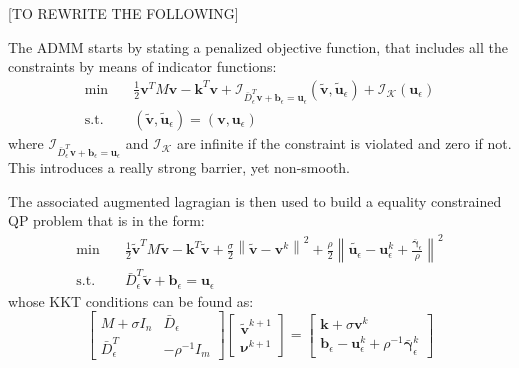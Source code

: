 \documentclass{svproc}
\newcommand{\vect}[1]{\bm{#1}}
\newcommand{\norm}[1]{\left\lVert#1\right\rVert}
\begin{document}
[TO REWRITE THE FOLLOWING]


The ADMM starts by stating a penalized objective function, that includes all the constraints by means of indicator functions:
\begin{subequations}
	\begin{align}
	\text{min} \quad & \frac{1}{2} \vect{v}^T M \vect{v} - \vect{k}^T\vect{v} + \mathcal{I}_{\bar{D}_{\epsilon}^T \vect{v} + \vect{b}_\epsilon  = \vect{u}_\epsilon} (\tilde{\vect{v}}, \tilde{\vect{u}}_\epsilon) +
	\mathcal{I}_{\mathcal{K}}(\vect{u}_\epsilon)\\
	\text{s.t.} \quad & (\tilde{\vect{v}}, \tilde{\vect{u}}_\epsilon) = (\vect{v}, \vect{u}_\epsilon)
	\end{align}
\end{subequations}
where $\mathcal{I}_{\bar{D}_{\epsilon}^T \vect{v} + \vect{b}_\epsilon  = \vect{u}_\epsilon}$ and $\mathcal{I}_{\mathcal{K}}$ are infinite if the constraint is violated and zero if not. This introduces a really strong barrier, yet non-smooth.

The associated augmented lagragian is then used to build a equality constrained QP problem that is in the form:
\begin{subequations}
	\begin{align}
	\text{min} \quad & \frac{1}{2} \tilde{\vect{v}}^T M \tilde{\vect{v}} - \vect{k}^T\tilde{\vect{v}} + \frac{\sigma}{2}\norm{\tilde{\vect{v}}-\vect{v}^k}^2 + \frac{\rho}{2}\norm{\tilde{\vect{u}_\epsilon}-\vect{u}_\epsilon^k + \frac{\bar{\vect{\gamma}}_\epsilon}{\rho}}^2\\
	\text{s.t.} \quad & \bar{D}_{\epsilon}^T \tilde{\vect{v}} + \vect{b}_\epsilon  = \vect{u}_\epsilon
	\end{align}
\end{subequations}
whose KKT conditions can be found as:
\begin{equation}
    \begin{bmatrix}
        M + \sigma I_n & \bar{D}_{\epsilon} \\
        \bar{D}_{\epsilon}^T & -\rho^{-1} I_m
    \end{bmatrix}
    \begin{bmatrix}
        \tilde{\vect{v}}^{k+1} \\
        \vect{\nu}^{k+1}
    \end{bmatrix}
    =
    \begin{bmatrix}
        \vect{k} + \sigma \vect{v}^k \\
        \vect{b}_\epsilon - \vect{u}_\epsilon^k + \rho^{-1}\bar{\vect{\gamma}}_\epsilon^k
    \end{bmatrix}
\end{equation}
\end{document}
